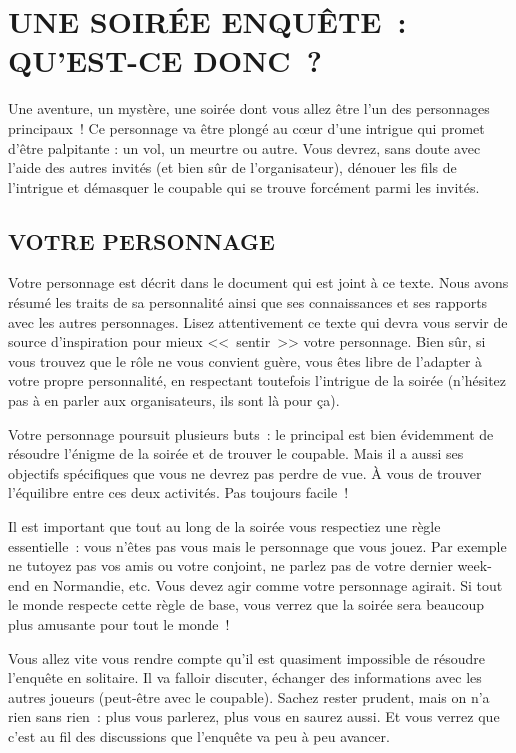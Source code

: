 \documentclass[14pt,twocolumn]{extarticle}
\begin{document}
\section{UNE SOIRÉE ENQUÊTE~: QU'EST-CE DONC~?}

Une aventure, un mystère, une soirée dont vous allez être l'un des personnages
principaux~! Ce personnage va être plongé au c\oe{}ur d'une intrigue qui promet
d'être palpitante : un vol, un meurtre ou autre. Vous devrez, sans doute avec
l'aide des autres invités (et bien sûr de l'organisateur), dénouer les fils de
l'intrigue et démasquer le coupable qui se trouve forcément parmi les invités.

\subsection{VOTRE PERSONNAGE}

Votre personnage est décrit dans le document qui est joint à ce texte. Nous
avons résumé les traits de sa personnalité ainsi que ses connaissances et ses
rapports avec les autres personnages. Lisez attentivement ce texte qui devra
vous servir de source d'inspiration pour mieux <<~sentir~>> votre personnage.
Bien sûr, si vous trouvez que le rôle ne vous convient guère, vous êtes libre
de l'adapter à votre propre personnalité, en respectant toutefois l'intrigue de
la soirée (n'hésitez pas à en parler aux organisateurs, ils sont là pour ça).

Votre personnage poursuit plusieurs buts~: le principal est bien évidemment de
résoudre l'énigme de la soirée et de trouver le coupable. Mais il a aussi ses
objectifs spécifiques que vous ne devrez pas perdre de vue. À vous de trouver
l'équilibre entre ces deux activités. Pas toujours facile~!

Il est important que tout au long de la soirée vous respectiez une règle
essentielle~: vous n'êtes pas vous mais le personnage que vous jouez. Par
exemple ne tutoyez pas vos amis ou votre conjoint, ne parlez pas de votre
dernier week-end en Normandie, etc. Vous devez agir comme votre personnage
agirait. Si tout le monde respecte cette règle de base, vous verrez que la
soirée sera beaucoup plus amusante pour tout le monde~!

Vous allez vite vous rendre compte qu'il est quasiment impossible de résoudre
l'enquête en solitaire. Il va falloir discuter, échanger des informations avec
les autres joueurs (peut-être avec le coupable). Sachez rester prudent, mais on
n'a rien sans rien~: plus vous parlerez, plus vous en saurez aussi. Et vous
verrez que c'est au fil des discussions que l'enquête va peu à peu avancer.
\end{document}
